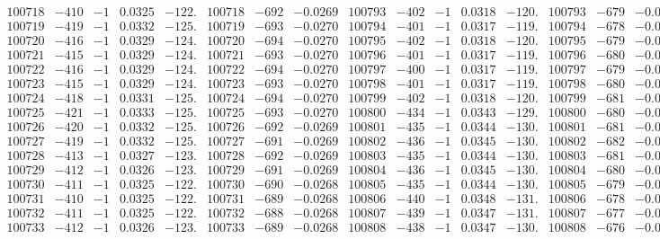\documentclass[11pt,reqno,a4letter]{article}
\numberwithin{figure}{section}
\numberwithin{table}{section}
\theoremstyle{plain}
\numberwithin{theorem}{section}
\theoremstyle{definition}
\begin{document}
\begin{table}[ht!]
\begin{equation*}
{\begin{array}{ccccc|ccc||ccccc|ccc}
100718 & -410 & -1 & 0.0325 & -122. & 100718 & -692 & -0.0269 & 100793 & -402 & -1 & 0.0318 & -120. & 100793 & -679 & -0.0264  \\
100719 & -419 & -1 & 0.0332 & -125. & 100719 & -693 & -0.0270 & 100794 & -401 & -1 & 0.0317 & -119. & 100794 & -678 & -0.0264  \\
100720 & -416 & -1 & 0.0329 & -124. & 100720 & -694 & -0.0270 & 100795 & -402 & -1 & 0.0318 & -120. & 100795 & -679 & -0.0264  \\
100721 & -415 & -1 & 0.0329 & -124. & 100721 & -693 & -0.0270 & 100796 & -401 & -1 & 0.0317 & -119. & 100796 & -680 & -0.0264  \\
100722 & -416 & -1 & 0.0329 & -124. & 100722 & -694 & -0.0270 & 100797 & -400 & -1 & 0.0317 & -119. & 100797 & -679 & -0.0264  \\
100723 & -415 & -1 & 0.0329 & -124. & 100723 & -693 & -0.0270 & 100798 & -401 & -1 & 0.0317 & -119. & 100798 & -680 & -0.0264  \\
100724 & -418 & -1 & 0.0331 & -125. & 100724 & -694 & -0.0270 & 100799 & -402 & -1 & 0.0318 & -120. & 100799 & -681 & -0.0265  \\
100725 & -421 & -1 & 0.0333 & -125. & 100725 & -693 & -0.0270 & 100800 & -434 & -1 & 0.0343 & -129. & 100800 & -680 & -0.0264  \\
100726 & -420 & -1 & 0.0332 & -125. & 100726 & -692 & -0.0269 & 100801 & -435 & -1 & 0.0344 & -130. & 100801 & -681 & -0.0265  \\
100727 & -419 & -1 & 0.0332 & -125. & 100727 & -691 & -0.0269 & 100802 & -436 & -1 & 0.0345 & -130. & 100802 & -682 & -0.0265  \\
100728 & -413 & -1 & 0.0327 & -123. & 100728 & -692 & -0.0269 & 100803 & -435 & -1 & 0.0344 & -130. & 100803 & -681 & -0.0265  \\
100729 & -412 & -1 & 0.0326 & -123. & 100729 & -691 & -0.0269 & 100804 & -436 & -1 & 0.0345 & -130. & 100804 & -680 & -0.0264  \\
100730 & -411 & -1 & 0.0325 & -122. & 100730 & -690 & -0.0268 & 100805 & -435 & -1 & 0.0344 & -130. & 100805 & -679 & -0.0264  \\
100731 & -410 & -1 & 0.0325 & -122. & 100731 & -689 & -0.0268 & 100806 & -440 & -1 & 0.0348 & -131. & 100806 & -678 & -0.0264  \\
100732 & -411 & -1 & 0.0325 & -122. & 100732 & -688 & -0.0268 & 100807 & -439 & -1 & 0.0347 & -131. & 100807 & -677 & -0.0263  \\
100733 & -412 & -1 & 0.0326 & -123. & 100733 & -689 & -0.0268 & 100808 & -438 & -1 & 0.0347 & -130. & 100808 & -676 & -0.0263  \\

\end{array}}
\end{equation*}
\end{table}
\end{document}
